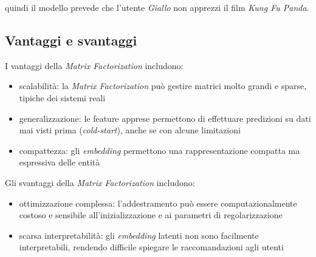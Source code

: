 quindi il modello prevede che l'utente \textit{Giallo} non apprezzi il film \textit{Kung Fu Panda}.

\subsection{Vantaggi e svantaggi}
I vantaggi della \textit{Matrix Factorization} includono:
\begin{itemize}
    \item scalabilità: la \textit{Matrix Factorization} può gestire matrici molto grandi e sparse, tipiche dei sistemi reali
    \item generalizzazione: le feature apprese permettono di effettuare predizioni su dati mai visti prima (\textit{cold-start}), anche se con alcune limitazioni
    \item compattezza: gli \textit{embedding} permettono una rappresentazione compatta ma espressiva delle entità
\end{itemize}

Gli svantaggi della \textit{Matrix Factorization} includono:

\begin{itemize}
    \item ottimizzazione complessa: l'addestramento può essere computazionalmente costoso e sensibile all'inizializzazione e ai parametri di regolarizzazione
    \item scarsa interpretabilità: gli \textit{embedding} latenti non sono facilmente interpretabili, rendendo difficile spiegare le raccomandazioni agli utenti
\end{itemize}